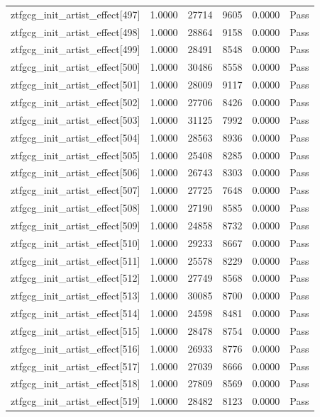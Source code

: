 \begin{table}[htbp]
\begin{tabular}{llrrll}
ztfgcg\_init\_artist\_effect[497] & 1.0000 & 27714 & 9605 & 0.0000 & Pass \\
ztfgcg\_init\_artist\_effect[498] & 1.0000 & 28864 & 9158 & 0.0000 & Pass \\
ztfgcg\_init\_artist\_effect[499] & 1.0000 & 28491 & 8548 & 0.0000 & Pass \\
ztfgcg\_init\_artist\_effect[500] & 1.0000 & 30486 & 8558 & 0.0000 & Pass \\
ztfgcg\_init\_artist\_effect[501] & 1.0000 & 28009 & 9117 & 0.0000 & Pass \\
ztfgcg\_init\_artist\_effect[502] & 1.0000 & 27706 & 8426 & 0.0000 & Pass \\
ztfgcg\_init\_artist\_effect[503] & 1.0000 & 31125 & 7992 & 0.0000 & Pass \\
ztfgcg\_init\_artist\_effect[504] & 1.0000 & 28563 & 8936 & 0.0000 & Pass \\
ztfgcg\_init\_artist\_effect[505] & 1.0000 & 25408 & 8285 & 0.0000 & Pass \\
ztfgcg\_init\_artist\_effect[506] & 1.0000 & 26743 & 8303 & 0.0000 & Pass \\
ztfgcg\_init\_artist\_effect[507] & 1.0000 & 27725 & 7648 & 0.0000 & Pass \\
ztfgcg\_init\_artist\_effect[508] & 1.0000 & 27190 & 8585 & 0.0000 & Pass \\
ztfgcg\_init\_artist\_effect[509] & 1.0000 & 24858 & 8732 & 0.0000 & Pass \\
ztfgcg\_init\_artist\_effect[510] & 1.0000 & 29233 & 8667 & 0.0000 & Pass \\
ztfgcg\_init\_artist\_effect[511] & 1.0000 & 25578 & 8229 & 0.0000 & Pass \\
ztfgcg\_init\_artist\_effect[512] & 1.0000 & 27749 & 8568 & 0.0000 & Pass \\
ztfgcg\_init\_artist\_effect[513] & 1.0000 & 30085 & 8700 & 0.0000 & Pass \\
ztfgcg\_init\_artist\_effect[514] & 1.0000 & 24598 & 8481 & 0.0000 & Pass \\
ztfgcg\_init\_artist\_effect[515] & 1.0000 & 28478 & 8754 & 0.0000 & Pass \\
ztfgcg\_init\_artist\_effect[516] & 1.0000 & 26933 & 8776 & 0.0000 & Pass \\
ztfgcg\_init\_artist\_effect[517] & 1.0000 & 27039 & 8666 & 0.0000 & Pass \\
ztfgcg\_init\_artist\_effect[518] & 1.0000 & 27809 & 8569 & 0.0000 & Pass \\
ztfgcg\_init\_artist\_effect[519] & 1.0000 & 28482 & 8123 & 0.0000 & Pass \\

\end{tabular}
\end{table}
